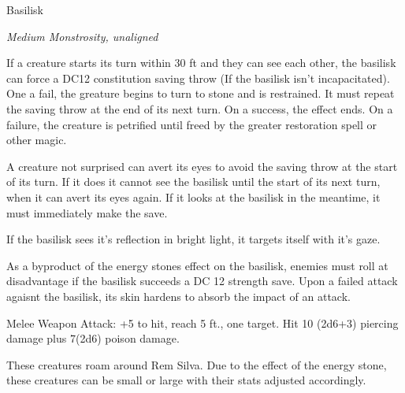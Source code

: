 \begin{monsterbox}{Basilisk}
	\begin{hangingpar}
		\textit{Medium Monstrosity, unaligned}
	\end{hangingpar}
	\dndline%
	\basics[%
	armorclass = 15,
	hitpoints  = 52,
	speed      = 20 ft
	]
	\dndline%
	\stats[
	STR = \stat{16}, %
	DEX = \stat{8},
	CON = \stat{15},
	INT = \stat{2},
	WIS = \stat{8},
	CHA = \stat{7}
	]
	\dndline%
	\details[%
	senses = {darkvision 60 ft., passive perception 9},
	challenge = 3 (700XP)
	]
	\dndline%
	\begin{monsteraction}
		If a creature starts its turn within 30 ft and they can see each other, the basilisk can force a DC12 constitution saving throw (If the basilisk isn't incapacitated). One a fail, the greature begins to turn to stone and is restrained. It must repeat the saving throw at the end of its next turn. On a success, the effect ends. On a failure,  the creature is petrified until freed by the greater restoration spell or other magic.
		
		A creature not surprised can avert its eyes to avoid the saving throw at the start of its turn. If it does it cannot see the basilisk until the start of its next turn, when it can avert its eyes again. If it looks at the basilisk in the meantime, it must immediately make the save.
		
		If the basilisk sees it's reflection in bright light, it targets itself with it's gaze. 
	\end{monsteraction}	
	\begin{monsteraction}
		As a byproduct of the energy stones effect on the basilisk, enemies must roll at disadvantage if the basilisk succeeds a DC 12 strength save. Upon a failed attack agaisnt the basilisk, its skin hardens to absorb the impact of an attack.
	\end{monsteraction}	
	\begin{monsteraction}[Bite]
		Melee Weapon Attack: +5 to hit, reach 5 ft., one target. Hit 10 (2d6+3) piercing damage plus 7(2d6) poison damage.
	\end{monsteraction}
	These creatures roam around Rem Silva. Due to the effect of the energy stone, these creatures can be small or large with their stats adjusted accordingly. 
\end{monsterbox}


